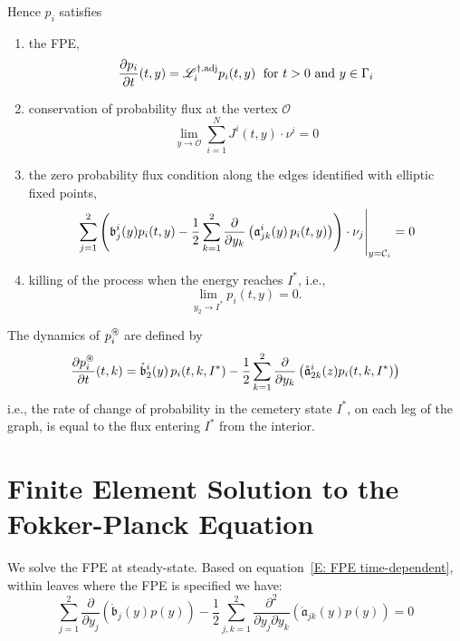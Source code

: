 Hence $p_i$ satisfies
\begin{enumerate}
\item the FPE,
\begin{equation}
\frac{\partial p_i}{\partial t}(t,y) = \mathscr L^{\dagger,\text{adj}}_i p_i(t,y) \; \text{ for } t > 0 \text{ and } y \in \Gamma_i
\label{E: FPE time-dependent}
\end{equation}

\item conservation of probability flux at the vertex $\mathcal{O}$
\begin{equation}
\lim_{y \to \mathcal O} \sum_{i = 1}^N J^i(t,y) \cdot \nu^i = 0
\label{E:cpfc}
\end{equation}

\item the zero probability flux condition along the edges identified with elliptic fixed points,
\begin{equation}
\eval{\sum_{j=1}^2 \left(\mathfrak b_j^i(y) p_i(t,y) - \frac12 \sum_{k=1}^2 \frac{\partial}{\partial y_k} \left(\Aa_{jk}^i(y)\,p_{i}(t,y)\right)\right) \cdot \nu_j}_{y = \bigc_i} = 0
\label{E:BC elliptic}
\end{equation}
\item killing of the process when the energy reaches $I^*$, i.e.,
\begin{equation}
\lim_{y_2 \to I^*} p_i(t,y) = 0.
\label{E:BC upper}
\end{equation}
\end{enumerate}
The dynamics of $p_i^\circledast$ are defined by
\[
\frac{\partial p_{i}^\circledast}{\partial t}(t,k) = \mathring{\mathfrak{b}}_2^{i}(y)\,p_i(t,k,I^*) - \frac12 \sum_{k=1}^2
\frac{\partial}{\partial y_k} \left(\mathring{\mathfrak a}_{2k}^i(z) p_i(t,k,I^*)\right)
\]
i.e., the rate of change of probability in the cemetery state $I^*$, on each leg of the graph, is equal to the flux entering $I^*$ from the interior.

\section{Finite Element Solution to the Fokker-Planck Equation}

We solve the FPE at steady-state. Based on equation~\eqref{E: FPE time-dependent}, within leaves where the FPE is specified we have:
\begin{equation}
\label{E:FPE}
\sum_{j=1}^2 \frac{\partial}{\partial y_j}(\mathring{\mathfrak b}_j(y) p(y)) - \frac12 \sum_{j,k=1}^2 \frac{\partial^2}{\partial y_j \partial y_k} (\mathring{\mathfrak a}_{jk}(y) p(y)) = 0
\end{equation}

